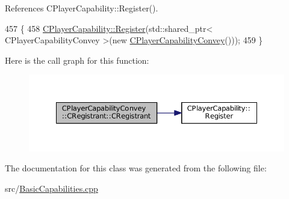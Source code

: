 References C\+Player\+Capability\+::\+Register().


\begin{DoxyCode}
457                                                \{
458     \hyperlink{classCPlayerCapability_a7e298018dcde2684451add3cfff065f7}{CPlayerCapability::Register}(std::shared\_ptr< CPlayerCapabilityConvey >(\textcolor{keyword}{new} 
      \hyperlink{classCPlayerCapabilityConvey_a49f00731755778e903503796adbbe451}{CPlayerCapabilityConvey}()));   
459 \}
\end{DoxyCode}
Here is the call graph for this function\+:\nopagebreak
\begin{figure}[H]
\begin{center}
\leavevmode
\includegraphics[width=350pt]{classCPlayerCapabilityConvey_1_1CRegistrant_a7ceb41f660b3b73dff670952658a2883_cgraph}
\end{center}
\end{figure}


The documentation for this class was generated from the following file\+:\begin{DoxyCompactItemize}
\item 
src/\hyperlink{BasicCapabilities_8cpp}{Basic\+Capabilities.\+cpp}\end{DoxyCompactItemize}
